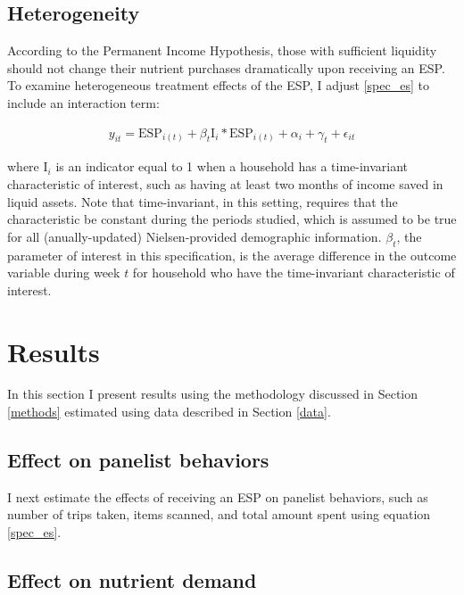 \documentclass[12pt]{article}
\begin{document}
\subsection{Heterogeneity}

According to the Permanent Income Hypothesis, those with sufficient liquidity should not change their nutrient purchases dramatically upon receiving an ESP.
To examine heterogeneous treatment effects of the ESP, I adjust \ref{spec_es} to include an interaction term:

\begin{align}
	y_{it} = \text{ESP}_{i(t)} + \beta_t \text{I}_{i} * \text{ESP}_{i(t)} + \alpha_i + \gamma_t + \epsilon_{it} \label{spec_het}
\end{align}

where $\text{I}_{i}$ is an indicator equal to 1 when a household has a time-invariant characteristic of interest, such as having at least two months of income saved in liquid assets.
Note that time-invariant, in this setting, requires that the characteristic be constant during the periods studied, which is assumed to be true for all (anually-updated) Nielsen-provided demographic information.
$\beta_t$, the parameter of interest in this specification, is the average difference in the outcome variable during week $t$ for household who have the time-invariant characteristic of interest.


\section{Results} \label{results}

In this section I present results using the methodology discussed in Section \ref{methods} estimated using data described in Section \ref{data}.

\subsection{Effect on panelist behaviors}

I next estimate the effects of receiving an ESP on panelist behaviors, such as number of trips taken, items scanned, and total amount spent using equation \ref{spec_es}.



\subsection{Effect on nutrient demand}
\end{document}
